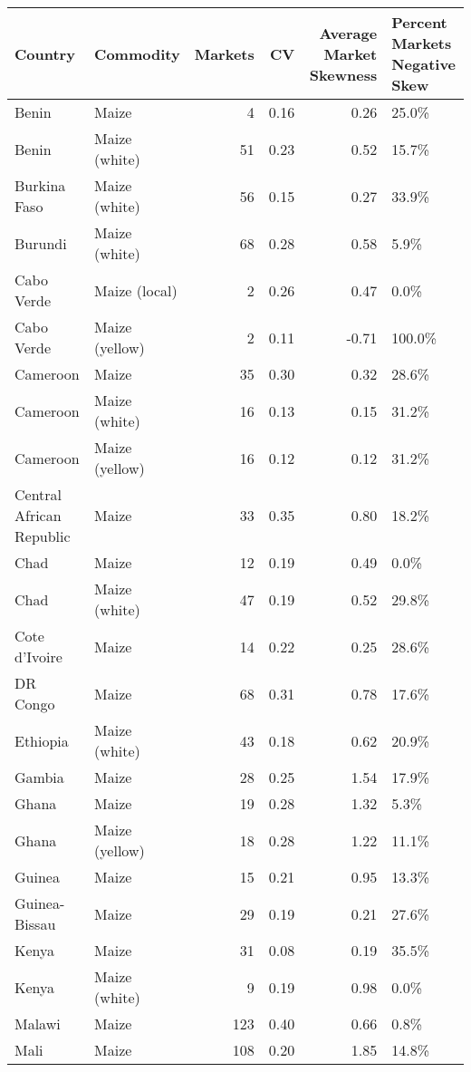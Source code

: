 \begin{table}[ht]
\centering
\begin{tabular}{llrrrl}
  \hline
Country & Commodity & Markets & CV & Average Market Skewness  & Percent Markets Negative Skew \\ 
  \hline
Benin & Maize &   4 & 0.16 & 0.26 & 25.0\% \\ 
  Benin & Maize (white) &  51 & 0.23 & 0.52 & 15.7\% \\ 
  Burkina Faso & Maize (white) &  56 & 0.15 & 0.27 & 33.9\% \\ 
  Burundi & Maize (white) &  68 & 0.28 & 0.58 & 5.9\% \\ 
  Cabo Verde & Maize (local) &   2 & 0.26 & 0.47 & 0.0\% \\ 
  Cabo Verde & Maize (yellow) &   2 & 0.11 & -0.71 & 100.0\% \\ 
  Cameroon & Maize &  35 & 0.30 & 0.32 & 28.6\% \\ 
  Cameroon & Maize (white) &  16 & 0.13 & 0.15 & 31.2\% \\ 
  Cameroon & Maize (yellow) &  16 & 0.12 & 0.12 & 31.2\% \\ 
  Central African Republic & Maize &  33 & 0.35 & 0.80 & 18.2\% \\ 
  Chad & Maize &  12 & 0.19 & 0.49 & 0.0\% \\ 
  Chad & Maize (white) &  47 & 0.19 & 0.52 & 29.8\% \\ 
  Cote d'Ivoire & Maize &  14 & 0.22 & 0.25 & 28.6\% \\ 
  DR Congo & Maize &  68 & 0.31 & 0.78 & 17.6\% \\ 
  Ethiopia & Maize (white) &  43 & 0.18 & 0.62 & 20.9\% \\ 
  Gambia & Maize &  28 & 0.25 & 1.54 & 17.9\% \\ 
  Ghana & Maize &  19 & 0.28 & 1.32 & 5.3\% \\ 
  Ghana & Maize (yellow) &  18 & 0.28 & 1.22 & 11.1\% \\ 
  Guinea & Maize &  15 & 0.21 & 0.95 & 13.3\% \\ 
  Guinea-Bissau & Maize &  29 & 0.19 & 0.21 & 27.6\% \\ 
  Kenya & Maize &  31 & 0.08 & 0.19 & 35.5\% \\ 
  Kenya & Maize (white) &   9 & 0.19 & 0.98 & 0.0\% \\ 
  Malawi & Maize & 123 & 0.40 & 0.66 & 0.8\% \\ 
  Mali & Maize & 108 & 0.20 & 1.85 & 14.8\% \\ 

\end{tabular}
\end{table}
